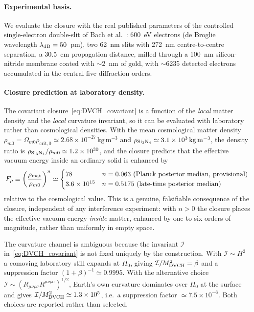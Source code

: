 \documentclass[pdflatex,sn-mathphys-num]{sn-jnl}%
\newcommand{\Omm}{\Omega_{m0}}
\newcommand{\Ecrit}{\rho_{\mathrm{crit},0}}
\begin{document}
\paragraph{Experimental basis.}
We evaluate the closure with the real published parameters of the controlled
single-electron double-slit of Bach et al.~\cite{Bach:2013}: 600~eV electrons
(de Broglie wavelength $\lambda_{\rm dB}=50$~pm), two 62~nm slits with 272~nm
centre-to-centre separation, a 30.5~cm propagation distance, milled through a
100~nm silicon-nitride membrane coated with $\sim$2~nm of gold, with $\sim$6235
detected electrons accumulated in the central five diffraction orders.

\paragraph{Closure prediction at laboratory density.}
The covariant closure~\eqref{eq:DVCH_covariant} is a function of the \emph{local}
matter density and the \emph{local} curvature invariant, so it can be evaluated
with laboratory rather than cosmological densities. With the mean cosmological
matter density $\rho_{m0}=\Omm\Ecrit\simeq 2.68\times10^{-27}\,\mathrm{kg\,m^{-3}}$
and $\rho_{\rm Si_3N_4}\simeq3.1\times10^{3}\,\mathrm{kg\,m^{-3}}$, the density
ratio is $\rho_{\rm Si_3N_4}/\rho_{m0}\simeq1.2\times10^{30}$, and the closure
predicts that the effective vacuum energy inside an ordinary solid is enhanced
by
\begin{equation}
F_\rho\equiv\left(\frac{\rho_{\rm mat}}{\rho_{m0}}\right)^{n}
\simeq\begin{cases}
78 & n=0.063\ \text{(Planck posterior median, provisional)}\\
3.6\times10^{15} & n=0.5175\ \text{(late-time posterior median)}
\end{cases}
\end{equation}
relative to the cosmological value. This is a genuine, falsifiable consequence
of the closure, independent of any interference experiment: with $n>0$ the
closure places the effective vacuum energy \emph{inside} matter, enhanced by one
to six orders of magnitude, rather than uniformly in empty space.

The curvature channel is ambiguous because the invariant
$\mathcal{I}$ in~\eqref{eq:DVCH_covariant} is not fixed uniquely by the
construction. With $\mathcal{I}\sim H^2$ a comoving laboratory still expands at
$H_0$, giving $\mathcal{I}/M_{\rm DVCH}^2=\beta$ and a suppression factor
$(1+\beta)^{-1}\simeq0.9995$. With the alternative choice
$\mathcal{I}\sim(R_{\mu\nu\rho\sigma}R^{\mu\nu\rho\sigma})^{1/2}$, Earth's own
curvature dominates over $H_0$ at the surface and gives
$\mathcal{I}/M_{\rm DVCH}^2\simeq1.3\times10^{5}$, i.e.\ a suppression factor
$\simeq7.5\times10^{-6}$. Both choices are reported rather than selected.
\end{document}
